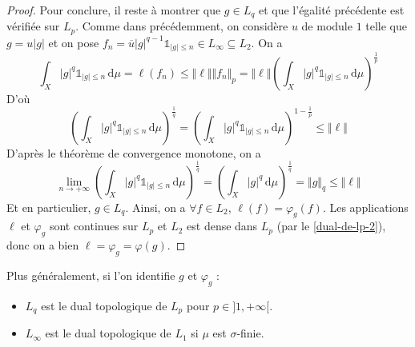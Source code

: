 \begin{proof}
		Pour conclure, il reste à montrer que $g \in L_q$ et que l'égalité précédente est vérifiée sur $L_p$. Comme dans précédemment, on considère $u$ de module $1$ telle que $g = u \vert g \vert$ et on pose $f_n = \overline{u} \vert g \vert^{q-1} \mathbb{1}_{\vert g \vert \leq n} \in L_\infty \subseteq L_2$. On a
		\[ \int_X \vert g \vert^q \mathbb{1}_{\vert g \vert \leq n} \, \mathrm{d}\mu = \ell(f_n) \leq \Vert \ell \Vert \Vert f_n \Vert_p = \Vert \ell \Vert \left ( \int_X \vert g \vert^q \mathbb{1}_{\vert g \vert \leq n} \, \mathrm{d}\mu \right )^{\frac{1}{p}} \]
		D'où
		\[ \left ( \int_X \vert g \vert^q \mathbb{1}_{\vert g \vert \leq n} \, \mathrm{d}\mu \right )^{\frac{1}{q}} = \left ( \int_X \vert g \vert^q \mathbb{1}_{\vert g \vert \leq n} \, \mathrm{d}\mu \right )^{1 - \frac{1}{p}} \leq \Vert \ell \Vert \]
		D'après le théorème de convergence monotone, on a
		\[ \lim_{n \rightarrow +\infty} \left ( \int_X \vert g \vert^q \mathbb{1}_{\vert g \vert \leq n} \, \mathrm{d}\mu \right )^{\frac{1}{q}} = \left ( \int_X \vert g \vert^q \, \mathrm{d}\mu \right )^{\frac{1}{q}} = \Vert g \Vert_q \leq \Vert \ell \Vert \]
		Et en particulier, $g \in L_q$. Ainsi, on a $\forall f \in L_2$, $\ell(f) = \varphi_g(f)$. Les applications $\ell$ et $\varphi_g$ sont continues sur $L_p$ et $L_2$ est dense dans $L_p$ (par le \cref{dual-de-lp-2}), donc on a bien $\ell = \varphi_g = \varphi(g)$.
	\end{proof}


	\begin{remark}
		Plus généralement, si l'on identifie $g$ et $\varphi_g$ :
		\begin{itemize}
			\item $L_q$ est le dual topologique de $L_p$ pour $p \in ]1, +\infty[$.
			\item $L_\infty$ est le dual topologique de $L_1$ si $\mu$ est $\sigma$-finie.
		\end{itemize}
	\end{remark}


